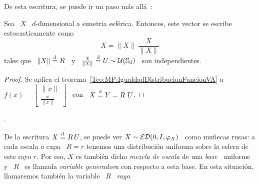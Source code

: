 De esta escritura, se puede ir un paso m\'as all\'a~\cite[Teo~2.3]{FanKot90}:
%
\begin{corolario}\label{Cor:MP:MezclaUniforme}
  Sea  \ $X$ \  $d$-dimensional a  simetria esf\'erica.  Entonces, este  vector se
  escribe estocasticamente como
  \[
  X =  \|X\| \: \frac{X}{\|X\|}
  \]
  tales  que  \ $\|  X  \|  \stackrel{\mathrm{d}}{=}  R$ \  y  \  $\frac{X}{\|X\|} \stackrel{\mathrm{d}}{=}  U  \sim
  \mathcal{U}(\mathbb{S}_d)$ \ son independientes.
\end{corolario}
%
\begin{proof}
  Se  aplica  el  teorema~\ref{Teo:MP:IgualdadDistribucionFuncionVA} a  \  $f(x)
  = \begin{bmatrix} \|x\|\\ \frac{x}{\|x\|} \end{bmatrix}$ \ con \ $X \stackrel{\mathrm{d}}{=} Y =
  R \ U$.
\end{proof}.

De la escritura  $X \stackrel{\mathrm{d}}{=} R \,  U$, se puede ver $X  \sim \mathcal{ED}(0,I,\varphi_X)$ \
como mu\~necas rusas: a cada escala o  capa \ $R = r$ tenemos una distribuci\'on
uniforma sobre la esfera de este rayo  $r$. Por eso, $X$ es tambi\'en dicho {\em
  mezcla de  escala} de  una {\em base}  \ uniforme  y \ $R$  \ es  llamada {\em
  variable generadora} con respecto a  esta base. En esta situaci\'on, llamaremos
tambi\'en la variable \ $R$ \ {\em rayo}.

